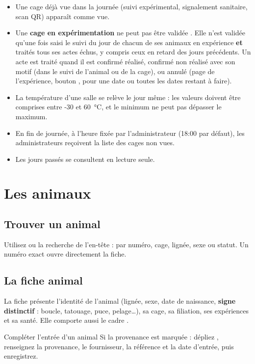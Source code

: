 \documentclass[11pt,a4paper]{article}
\begin{document}
\begin{regle}
\begin{itemize}
  \item Une cage déjà vue dans la journée (suivi expérimental, signalement
    sanitaire, scan QR) apparaît comme vue.
  \item Une \textbf{cage en expérimentation} ne peut pas être validée
    . Elle n'est validée qu'une fois saisi le suivi du jour de
    chacun de ses animaux en expérience \textbf{et} traités tous ses actes
    échus, y compris ceux en retard des jours précédents. Un acte est traité
    quand il est confirmé réalisé, confirmé non réalisé avec son motif (dans
    le suivi de l'animal ou de la cage), ou annulé (page  de
    l'expérience, bouton , pour une date ou toutes les dates
    restant à faire).
  \item La température d'une salle se relève le jour même : les valeurs
    doivent être comprises entre -30 et 60~°C, et le minimum ne peut pas
    dépasser le maximum.
  \item En fin de journée, à l'heure fixée par l'administrateur (18:00 par
    défaut), les administrateurs reçoivent la liste des cages non vues.
  \item Les jours passés se consultent en lecture seule.
\end{itemize}
\end{regle}

\section{Les animaux}

\subsection{Trouver un animal}
Utilisez  ou la recherche de l'en-tête :
par numéro, cage, lignée, sexe ou statut. Un numéro exact ouvre directement la
fiche.

\subsection{La fiche animal}
La fiche présente l'identité de l'animal (lignée, sexe, date de naissance,
\textbf{signe distinctif} : boucle, tatouage, puce, pelage…), sa cage, sa
filiation, ses expériences et sa santé. Elle comporte aussi le cadre
.

\begin{procedure}{Compléter l'entrée d'un animal}
Si la provenance est marquée  : dépliez , renseignez la provenance, le fournisseur, la
référence et la date d'entrée, puis enregistrez.
\end{procedure}
\end{document}
